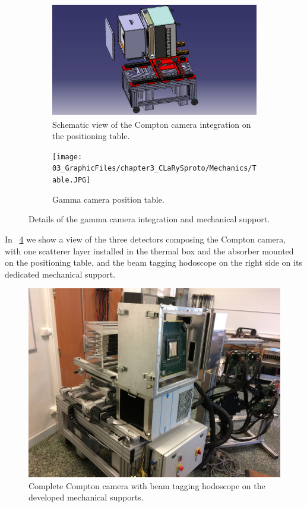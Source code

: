 \begin{figure}
\begin{subfigure}[t]{.5\textwidth}
\centering
\includegraphics[width=1\textwidth, trim= {1cm 0 1cm 0}, clip = true, height=5cm]{03_GraphicFiles/chapter3_CLaRySproto/Mechanics/TableCameraSchemeBlue.jpg}
\caption{Schematic view of the Compton camera integration on the positioning table.}
\label{chap3::fig::schemeTable}
\end{subfigure}
\begin{subfigure}[t]{.5\textwidth}
\centering
\texttt{[image: 03\_GraphicFiles/chapter3\_CLaRySproto/Mechanics/Table.JPG]}
\caption{Gamma camera position table.}
\label{chap3::fig::pictureTable}
\end{subfigure}
\caption{Details of the gamma camera integration and mechanical support.}
\label{chap3::fig::CameraIntegration}
\end{figure}

In \figurename~\ref{chap3::fig::cameraAllPicture} we show a view of the three detectors composing the Compton camera, with one scatterer layer installed in the thermal box and the absorber mounted on the positioning table, and the beam tagging hodoscope on the right side on its dedicated mechanical support.\\

\begin{figure}[!htbp]
\centering
\includegraphics[width=\textwidth]{03_GraphicFiles/chapter3_CLaRySproto/camera_complete.JPG}
\caption{Complete Compton camera with beam tagging hodoscope on the developed mechanical supports.}
\label{chap3::fig::cameraAllPicture}
\end{figure}


